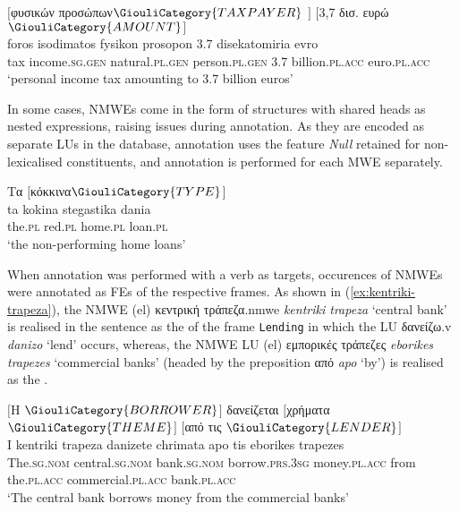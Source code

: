 \documentclass[output=paper,colorlinks,citecolor=brown]{langscibook}
\begin{document}
\ea
\label{ex:fysiko-prosopo}
\glll
{}  {$[$φυσικών} {προσώπων$\GiouliCategory{TAXPAYER}$ $]$} {$[$3,7 δισ. ευρώ$\GiouliCategory{AMOUNT}$$]$ }\\
{foros} {isodimatos} {fysikon} {prosopon} {3.7 disekatomiria evro} \\
{tax} {income}.\textsc{sg.gen} {natural.\textsc{pl.gen}} {person.\textsc{pl.gen}} {3.7 billion.\textsc{pl.acc} euro.\textsc{pl.acc}}\\
\glt ‘personal income tax amounting to 3.7 billion euros’
\z

In some cases, NMWEs come in the form of structures with shared heads as nested expressions, raising issues during annotation. As they are encoded as separate LUs in the database, annotation uses the feature \textit{Null} retained for non-lexicalised constituents, and annotation is performed for each MWE separately.

\ea
\label{ex:shared}
\glll
{Τα} {$[$κόκκινα$\GiouliCategory{TYPE}$$]$}   \\
{ta} {kokina} {stegastika} {dania} \\
{the.\textsc{pl}} {red.\textsc{pl}} {home.\textsc{pl}} {loan.\textsc{pl}} \\
\glt ‘the non-performing home loans’
\z

When annotation was performed with a verb as targets, occurences of NMWEs were annotated as FEs of the respective frames. As shown in (\ref{ex:kentriki-trapeza}), the NMWE (el) {{κεντρική}} {{τράπεζα}}.nmwe \textit{kentriki trapeza} `central bank' is realised in the sentence as the  of the frame \texttt{Lending} in which the LU {δανείζω}.v \textit{danizo} `lend' occurs, whereas, the NMWE LU (el) {{εμπορικές τράπεζες}} \textit{eborikes trapezes} `commercial banks' (headed by the preposition από \textit{apo} `by') is realised as the .


\ea
\label{ex:kentriki-trapeza}
\glll
{$[$Η} {} {$\GiouliCategory{BORROWER}$$]$} {δανείζεται} {$[$χρήματα$\GiouliCategory{THEME}$$]$} {$[$από} {τις} {} {$\GiouliCategory{LENDER}$$]$} \\
{I} {kentriki} {trapeza} {danizete} {chrimata} {apo} {tis} {eborikes} {trapezes} \\
{The.\textsc{sg.nom}} {central.\textsc{sg.nom}} {bank.\textsc{sg.nom}} {borrow.\textsc{prs.3sg}} {money.\textsc{pl.acc}} {from} {the.\textsc{pl.acc}} {commercial.\textsc{pl.acc}} {bank.\textsc{pl.acc}} \\
\glt ‘The central bank borrows money from the commercial banks’ \\
\z 
\end{document}
